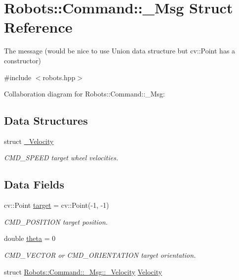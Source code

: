 \hypertarget{struct_robots_1_1_command_1_1___msg}{}\section{Robots\+:\+:Command\+:\+:\+\_\+\+Msg Struct Reference}
\label{struct_robots_1_1_command_1_1___msg}


The message (would be nice to use Union data structure but cv\+::\+Point has a constructor)  




{\ttfamily \#include $<$robots.\+hpp$>$}



Collaboration diagram for Robots\+:\+:Command\+:\+:\+\_\+\+Msg\+:
\subsection*{Data Structures}
\begin{DoxyCompactItemize}
\item 
struct \hyperlink{struct_robots_1_1_command_1_1___msg_1_1___velocity}{\+\_\+\+Velocity}
\begin{DoxyCompactList}\small\item\em C\+M\+D\+\_\+\+S\+P\+E\+ED target wheel velocities. \end{DoxyCompactList}\end{DoxyCompactItemize}
\subsection*{Data Fields}
\begin{DoxyCompactItemize}
\item 
cv\+::\+Point \hyperlink{struct_robots_1_1_command_1_1___msg_a86e7180d8d9c511620c703377870775e}{target} = cv\+::\+Point(-\/1, -\/1)
\begin{DoxyCompactList}\small\item\em C\+M\+D\+\_\+\+P\+O\+S\+I\+T\+I\+ON target position. \end{DoxyCompactList}\item 
double \hyperlink{struct_robots_1_1_command_1_1___msg_a21599dd0707b283bf1ba1f25544bfb1d}{theta} = 0
\begin{DoxyCompactList}\small\item\em C\+M\+D\+\_\+\+V\+E\+C\+T\+OR or C\+M\+D\+\_\+\+O\+R\+I\+E\+N\+T\+A\+T\+I\+ON target orientation. \end{DoxyCompactList}\item 
struct \hyperlink{struct_robots_1_1_command_1_1___msg_1_1___velocity}{Robots\+::\+Command\+::\+\_\+\+Msg\+::\+\_\+\+Velocity} \hyperlink{struct_robots_1_1_command_1_1___msg_a539fff26601e0902fcf867eab3e08d79}{Velocity}
\end{DoxyCompactItemize}


